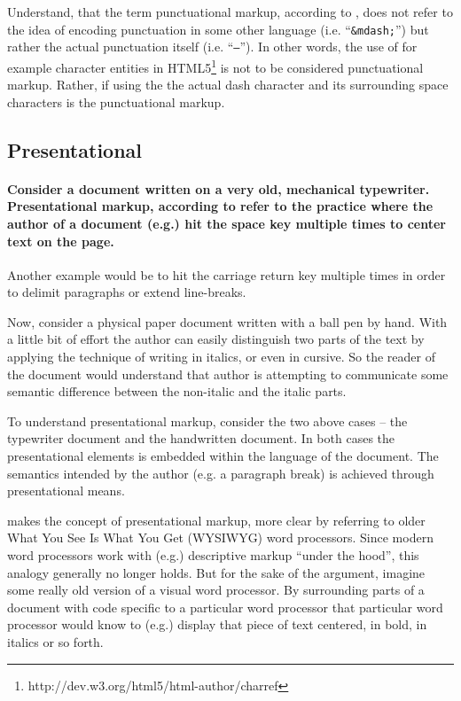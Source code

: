 \documentclass{scrreprt}
\begin{document}
Understand, that the term punctuational markup, according to \citet{coombs}, does not refer to the idea of encoding punctuation in some other language (i.e. ``\texttt{\&mdash;}'') but rather the actual punctuation itself (i.e. ``\texttt{--}''). In other words, the use of for example character entities in HTML5\footnote{ http://dev.w3.org/html5/html-author/charref} is not to be considered punctuational markup. Rather, if using the the actual dash character and its surrounding space characters is the punctuational markup.




\subsection{Presentational}
\paragraph{Consider a document written on a very old, mechanical typewriter. Presentational markup, according to \citet{coombs} refer to the practice where the author of a document (e.g.) hit the space key multiple times to center text on the page.} Another example would be to hit the carriage return key multiple times in order to delimit paragraphs or extend line-breaks.

Now, consider a physical paper document written with a ball pen by hand. With a little bit of effort the author can easily distinguish two parts of the text by applying the technique of writing in italics, or even in cursive. So the reader of the document would understand that author is attempting to communicate some semantic difference between the non-italic and the italic parts.

To understand presentational markup, consider the two above cases -- the typewriter document and the handwritten document. In both cases the presentational elements is embedded within the language of the document. The semantics intended by the author (e.g. a paragraph break) is achieved through presentational means.

\citet{bray} makes the concept of presentational markup, more clear by referring to older What You See Is What You Get (WYSIWYG) word processors. Since modern word processors work with (e.g.) descriptive markup ``under the hood'', this analogy generally no longer holds. But for the sake of the argument, imagine some really old version of a visual word processor. By surrounding parts of a document with code specific to a particular word processor that particular word processor would know to (e.g.) display that piece of text centered, in bold, in italics or so forth.
\end{document}
